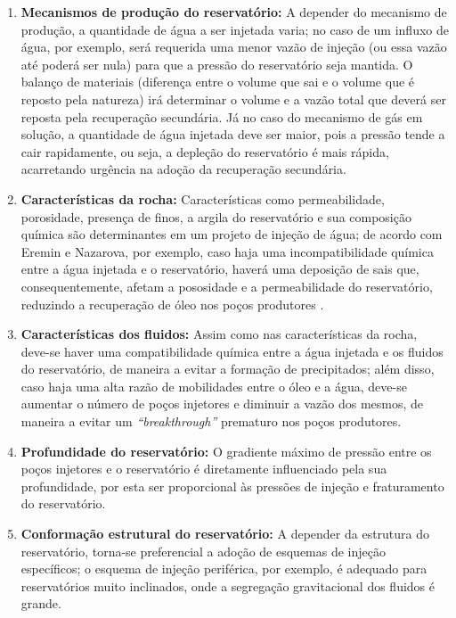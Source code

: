 \begin{enumerate}
\item \textbf{Mecanismos de produ\c{c}\~{a}o do reservat\'{o}rio:} A depender do mecanismo de produ\c{c}\~{a}o, a quantidade de \'{a}gua a ser injetada varia; no caso de um influxo de \'{a}gua, por exemplo, ser\'{a} requerida uma menor vaz\~{a}o de inje\c{c}\~{a}o (ou essa vaz\~{a}o at\'{e} poder\'{a} ser nula) para que a press\~{a}o do reservat\'{o}rio seja mantida. O balan\c{c}o de materiais (diferen\c{c}a entre o volume que sai e o volume que \'{e} reposto pela natureza) ir\'{a} determinar o volume e a vaz\~{a}o total que dever\'{a} ser reposta pela recupera\c{c}\~{a}o secund\'{a}ria. J\'{a} no caso do mecanismo de g\'{a}s em solu\c{c}\~{a}o, a quantidade de \'{a}gua injetada deve ser maior, pois a press\~{a}o tende a cair rapidamente, ou seja, a deple\c{c}\~{a}o do reservat\'{o}rio \'{e} mais r\'{a}pida, acarretando urg\^{e}ncia na ado\c{c}\~{a}o da recupera\c{c}\~{a}o secund\'{a}ria.

\item \textbf{Caracter\'{i}sticas da rocha:} Caracter\'{i}sticas como permeabilidade, porosidade, presen\c{c}a de finos, a argila do reservat\'{o}rio e sua composi\c{c}\~{a}o qu\'{i}mica s\~{a}o determinantes em um projeto de inje\c{c}\~{a}o de \'{a}gua; de acordo com Eremin e Nazarova, por exemplo, caso haja uma incompatibilidade qu\'{i}mica entre a \'{a}gua injetada e o reservat\'{o}rio, haver\'{a} uma deposi\c{c}\~{a}o de sais que, consequentemente, afetam a pososidade e a permeabilidade do reservat\'{o}rio, reduzindo a recupera\c{c}\~{a}o de \'{o}leo nos po\c{c}os produtores \cite{eremin}.

\item \textbf{Caracter\'{i}sticas dos fluidos:} Assim como nas caracter\'{i}sticas da rocha, deve-se haver uma compatibilidade qu\'{i}mica entre a \'{a}gua injetada e os fluidos do reservat\'{o}rio, de maneira a evitar a forma\c{c}\~{a}o de precipitados; al\'{e}m disso, caso haja uma alta raz\~{a}o de mobilidades entre o \'{o}leo e a \'{a}gua, deve-se aumentar o n\'{u}mero de po\c{c}os injetores e diminuir a vaz\~{a}o dos mesmos, de maneira a evitar um \textit{``breakthrough''} prematuro nos po\c{c}os produtores.

\item \textbf{Profundidade do reservat\'{o}rio:} O gradiente m\'{a}ximo de press\~{a}o entre os po\c{c}os injetores e o reservat\'{o}rio \'{e} diretamente influenciado pela sua profundidade, por esta ser proporcional \`{a}s press\~{o}es de inje\c{c}\~{a}o e fraturamento do reservat\'{o}rio.

\item \textbf{Conforma\c{c}\~{a}o estrutural do reservat\'{o}rio:} A depender da estrutura do reservat\'{o}rio, torna-se preferencial a ado\c{c}\~{a}o de esquemas de inje\c{c}\~{a}o espec\'{i}ficos; o esquema de inje\c{c}\~{a}o perif\'{e}rica, por exemplo, \'{e} adequado para reservat\'{o}rios muito inclinados, onde a segrega\c{c}\~{a}o gravitacional dos fluidos \'{e} grande.
\end{enumerate}

